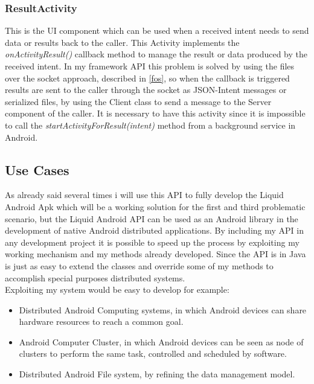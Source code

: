 \subsubsection{ResultActivity}
This is the UI component which can be used when a received intent needs to send data or results back to the caller. This Activity implements the \textit{onActivityResult()} callback method to manage the result or data produced by the received intent. In my framework API this problem is solved by using the files over the socket approach, described in \ref{fos}, so when the callback is triggered results are sent to the caller through the socket as JSON-Intent messages or serialized files, by using the Client class to send a message to the Server component of the caller. It is necessary to have this activity since it is impossible to call the \textit{startActivityForResult(intent)} method from a background service in Android.

\subsection{Use Cases}
As already said several times i will use this API to fully develop the Liquid Android Apk which will be a working solution for the first and third problematic scenario, but the Liquid Android API can be used as an Android library in the development of native Android distributed applications. By including my API in any development project it is possible to speed up the process by exploiting my working mechanism and my methods already developed. Since the API is in Java is just as easy to extend the classes and override some of my methods to accomplish special purposes distributed systems.\\
Exploiting my system would be easy to develop for example:
\begin{itemize}
	\item Distributed Android Computing systems, in which Android devices can share hardware resources to reach a common goal.
	\item Android Computer Cluster, in which Android devices can be seen as node of clusters to perform the same task, controlled and scheduled by software.
	\item Distributed Android File system, by refining the data management model.
\end{itemize}


%
